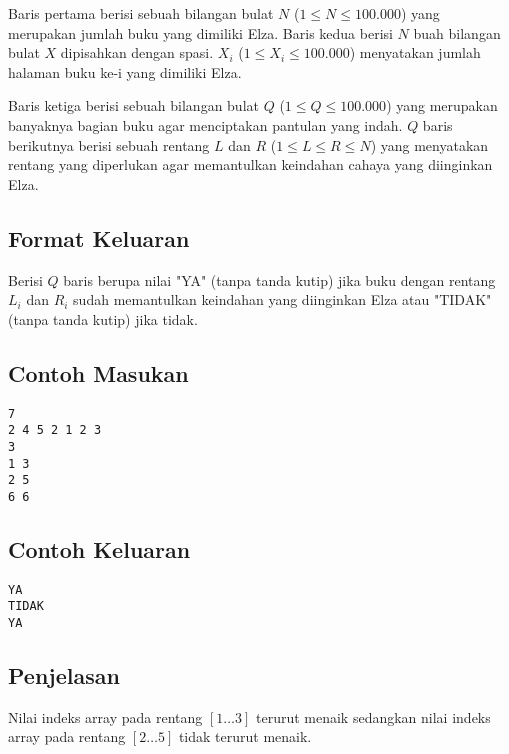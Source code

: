 \documentclass{article}
\begin{document}
Baris pertama berisi sebuah bilangan bulat $N$ ($1 \leq N \leq 100.000$) yang merupakan jumlah buku yang dimiliki Elza.
Baris kedua berisi $N$ buah bilangan bulat $X$ dipisahkan dengan spasi. $X_i$ ($1 \leq X_i \leq 100.000$) menyatakan jumlah halaman buku ke-i yang dimiliki Elza.

Baris ketiga berisi sebuah bilangan bulat $Q$ ($1 \leq Q \leq 100.000$) yang merupakan banyaknya bagian buku agar menciptakan pantulan yang indah.
$Q$ baris berikutnya berisi sebuah rentang $L$ dan $R$ ($1 \leq L \leq R \leq N$) yang menyatakan rentang yang diperlukan agar memantulkan keindahan cahaya yang diinginkan Elza.

\subsection*{Format Keluaran}

Berisi $Q$ baris berupa nilai "YA" (tanpa tanda kutip) 
jika buku dengan rentang $L_i$ dan $R_i$ sudah memantulkan keindahan yang diinginkan Elza 
atau "TIDAK" (tanpa tanda kutip) jika tidak.
\\

\begin{multicols}{2}
\subsection*{Contoh Masukan}
\begin{lstlisting}
7
2 4 5 2 1 2 3
3
1 3
2 5
6 6
\end{lstlisting}
\columnbreak
\subsection*{Contoh Keluaran}
\begin{lstlisting}
YA
TIDAK
YA
\end{lstlisting}
\vfill
\null
\end{multicols}

\subsection*{Penjelasan}
Nilai indeks array pada rentang $[1\ldots3]$ terurut menaik sedangkan nilai indeks array pada rentang $[2\ldots5]$ tidak terurut menaik.

\pagebreak
\end{document}

